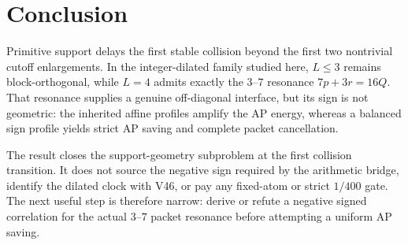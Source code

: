\section{Conclusion}

Primitive support delays the first stable collision beyond the first two nontrivial
cutoff enlargements.  In the integer-dilated family studied here, $L\le3$ remains
block-orthogonal, while $L=4$ admits exactly the $3$--$7$ resonance
$7p+3r=16Q$.  That resonance supplies a genuine off-diagonal interface, but its sign is
not geometric: the inherited affine profiles amplify the AP energy, whereas a balanced
sign profile yields strict AP saving and complete packet cancellation.

The result closes the support-geometry subproblem at the first collision transition.
It does not source the negative sign required by the arithmetic bridge, identify the
dilated clock with V46, or pay any fixed-atom or strict $1/400$ gate.  The next useful
step is therefore narrow: derive or refute a negative signed correlation for the actual
$3$--$7$ packet resonance before attempting a uniform AP saving.
